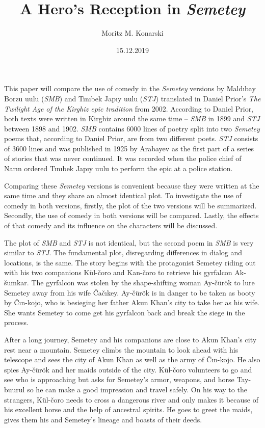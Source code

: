 \documentclass[12pt,a4paper]{article}
\newcommand{\Se} {Semetey}
\newcommand{\Ac} {Ay-čürök}
\newcommand{\Ca} {Čačıkey}
\newcommand{\Ck} {Čın-kojo}
\newcommand{\As} {Ak-šumkar}
\newcommand{\Ak} {Akun Khan}
\newcommand{\Tb} {Tay-buurul}
\newcommand{\Mb} {Maldıbay Borzu uulu}
\newcommand{\Mbs}{\emph{SMB}}
\newcommand{\Tj} {Tınıbek Japıy uulu}
\newcommand{\Tjs}{\emph{STJ}}
\newcommand{\Dp} {Daniel Prior}
\newcommand{\Kuc}{Kül-čoro}
\newcommand{\Kac}{Kan-čoro}
\newcommand{\Dpt}{The Twilight Age of the Kirghiz epic tradition}
\begin{document}
\title{A Hero's Reception in \emph{Semetey}}
\author{Moritz M. Konarski}
\date{15.12.2019}
\maketitle

This paper will compare the use of comedy in the \emph{\Se{}}
versions by \Mb{} (\Mbs{}) and \Tj{} (\Tjs{}) translated in \Dp{}'s \emph{\Dpt} from 2002.
According to \Dp{}, both texts were written in Kirghiz around the same time --
\Mbs{} in 1899 and \Tjs{} between 1898 and 1902. \Mbs{} contains 6000
lines of poetry split into two \emph{\Se{}} poems that, according to \Dp{}, are from 
two different poets. \Tjs{} consists of 3600 lines and was published in 1925 by
Arabayev as the first part of a series of stories that was never continued. It was 
recorded when the police chief of Narın ordered \Tj{} to perform the epic at
a police station.

Comparing these \emph{\Se{}} versions is convenient because they were written at 
the same time and they share an almost identical plot. To investigate the use 
of comedy in both versions, firstly, the plot 
of the two versions will be summarized. Secondly, the use of comedy in both
versions will be compared. Lastly, the effects of that comedy and its influence 
on the characters will be discussed.

The plot of \Mbs{} and \Tjs{} is not identical, but the second poem in \Mbs{}
is very similar to \Tjs{}. The fundamental plot, disregarding differences in
dialog and locations, is the same. 
The story begins with the protagonist \Se{} riding out with his two companions \Kuc{} 
and \Kac{} to retrieve his gyrfalcon \As{}. The gyrfalcon was stolen by the
shape-shifting woman \Ac{} to 
lure \Se{} away from his wife \Ca{}. \Ac{} is in danger to be taken 
as booty by \Ck{}, who is besieging her father \Ak{}'s city to take her as his
wife. She wants \Se{} to come get his gyrfalcon back and break the siege in the
process.

After a long journey, \Se{} and his companions are close to \Ak{}'s city rest
near a mountain.
\Se{} climbs the mountain to look ahead with his telescope and
sees the city of \Ak{} as well as the army of \Ck{}. He also spies \Ac{} and her maids
outside of the city. \Kuc{} volunteers to go and see who is approaching but asks 
for \Se{}'s armor, weapons, and horse \Tb{} so he can make a good
impression and travel safely. On his way to the strangers, \Kuc{} needs to cross
a dangerous river and only makes it because of his excellent horse and
the help of ancestral spirits. He goes to greet the maids, gives them his and \Se{}'s
lineage and boasts of their deeds.
\end{document}
